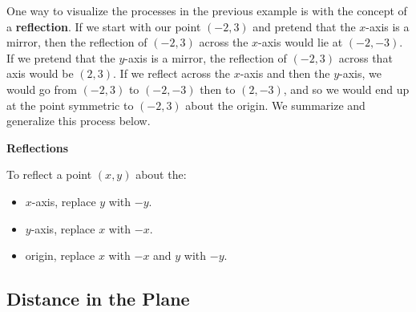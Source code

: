 \documentclass{ximera}
\begin{document}
\begin{example}
\begin{center}
\end{center}



\end{example}

One way to visualize the processes in the previous example is with the concept of a  \textbf{reflection}.  If we start with our point $(-2,3)$ and pretend that the $x$-axis is a mirror, then the reflection of $(-2,3)$ across the $x$-axis would lie at $(-2,-3)$.  If we pretend that the $y$-axis is a mirror, the reflection of $(-2,3)$ across that axis would be $(2,3)$.  If we reflect across the $x$-axis and then the $y$-axis, we would go from $(-2,3)$ to $(-2,-3)$ then to $(2,-3)$, and so we would end up at the point symmetric to $(-2,3)$ about the origin.  We summarize and generalize this process below.

 


% 

\centerline{\textbf{Reflections}} \label{reflectionsinabox}

\hspace{.17in} To reflect a point $(x,y)$ about the:

\begin{itemize}

\item  $x$-axis, replace $y$ with $-y$.

\item  $y$-axis, replace $x$ with $-x$.

\item  origin, replace $x$ with $-x$ and $y$ with $-y$.

\end{itemize}


\subsection{Distance in the Plane}
\label{Distance}
\end{document}

